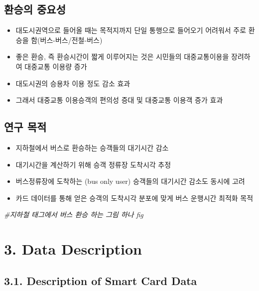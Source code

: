 \documentclass[
]{article}
\newenvironment{Shaded}{\begin{snugshade}}{\end{snugshade}}
\newcommand{\CommentTok}[1]{\textcolor[rgb]{0.56,0.35,0.01}{\textit{#1}}}
\begin{document}
\hypertarget{uxd658uxc2b9uxc758-uxc911uxc694uxc131}{%
\subsection{환승의 중요성}\label{uxd658uxc2b9uxc758-uxc911uxc694uxc131}}

\begin{itemize}
\item
  대도시권역으로 들어올 때는 목적지까지 단일 통행으로 들어오기 어려워서
  주로 환승을 함(버스-버스/전철-버스)
\item
  좋은 환승, 즉 환승시간이 짧게 이루어지는 것은 시민들의 대중교통이용을
  장려하여 대중교통 이용량 증가
\item
  대도시권의 승용차 이용 정도 감소 효과
\item
  그래서 대중교통 이용승객의 편의성 증대 및 대중교통 이용객 증가 효과
\end{itemize}

\hypertarget{uxc5f0uxad6c-uxbaa9uxc801}{%
\subsection{연구 목적}\label{uxc5f0uxad6c-uxbaa9uxc801}}

\begin{itemize}
\item
  지하철에서 버스로 환승하는 승객들의 대기시간 감소
\item
  대기시간을 계산하기 위해 승객 정류장 도착시각 추정
\item
  버스정류장에 도착하는 (bus only user) 승객들의 대기시간 감소도 동시에
  고려
\item
  카드 데이터를 통해 얻은 승객의 도착시각 분포에 맞게 버스 운행시간
  최적화 목적
\end{itemize}

\begin{Shaded}
\begin{Highlighting}[]
\CommentTok{\#지하철 태그에서 버스 환승 하는 그림 하나 fig}
\end{Highlighting}
\end{Shaded}

\hypertarget{data-description}{%
\section{3. Data Description}\label{data-description}}

\hypertarget{description-of-smart-card-data}{%
\subsection{3.1. Description of Smart Card
Data}\label{description-of-smart-card-data}}
\end{document}
